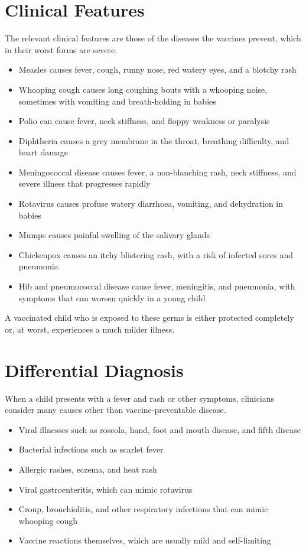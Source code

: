 \section*{Clinical Features}
The relevant clinical features are those of the diseases the vaccines prevent, which in their worst forms are severe.

\begin{itemize}
    \item Measles causes fever, cough, runny nose, red watery eyes, and a blotchy rash
    \item Whooping cough causes long coughing bouts with a whooping noise, sometimes with vomiting and breath-holding in babies
    \item Polio can cause fever, neck stiffness, and floppy weakness or paralysis
    \item Diphtheria causes a grey membrane in the throat, breathing difficulty, and heart damage
    \item Meningococcal disease causes fever, a non-blanching rash, neck stiffness, and severe illness that progresses rapidly
    \item Rotavirus causes profuse watery diarrhoea, vomiting, and dehydration in babies
    \item Mumps causes painful swelling of the salivary glands
    \item Chickenpox causes an itchy blistering rash, with a risk of infected sores and pneumonia
    \item Hib and pneumococcal disease cause fever, meningitis, and pneumonia, with symptoms that can worsen quickly in a young child
\end{itemize}

A vaccinated child who is exposed to these germs is either protected completely or, at worst, experiences a much milder illness.

\section*{Differential Diagnosis}
When a child presents with a fever and rash or other symptoms, clinicians consider many causes other than vaccine-preventable disease.

\begin{itemize}
    \item Viral illnesses such as roseola, hand, foot and mouth disease, and fifth disease
    \item Bacterial infections such as scarlet fever
    \item Allergic rashes, eczema, and heat rash
    \item Viral gastroenteritis, which can mimic rotavirus
    \item Croup, bronchiolitis, and other respiratory infections that can mimic whooping cough
    \item Vaccine reactions themselves, which are usually mild and self-limiting
\end{itemize}

